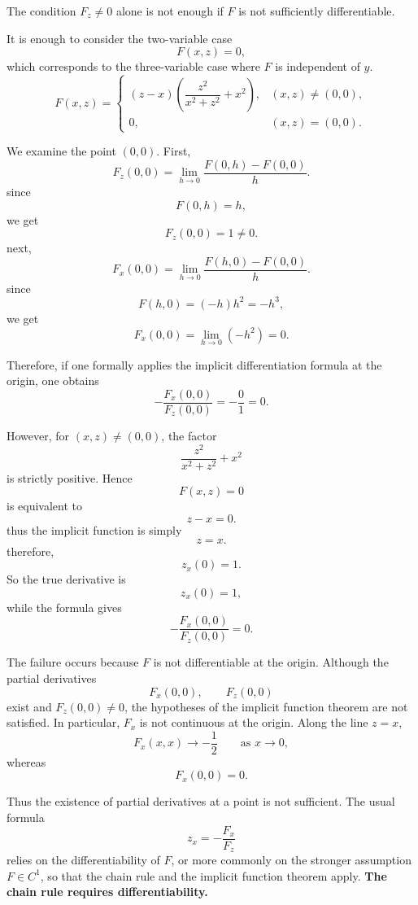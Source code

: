 \documentclass[a4]{overview}
\begin{document}
The condition \(F_z\neq 0\) alone is not enough if \(F\) is not sufficiently differentiable.

\begin{example}[A Counterexample]	

It is enough to consider the two-variable case
\[
F(x,z)=0,
\]
which corresponds to the three-variable case where \(F\) is independent of \(y\).
\[
F(x,z)=
\begin{cases}
(z-x)\left(\dfrac{z^2}{x^2+z^2}+x^2\right),
& (x,z)\neq (0,0),\\[1em]
0,
& (x,z)=(0,0).
\end{cases}
\]

We examine the point \((0,0)\). First,
\[
F_z(0,0)
=
\lim_{h\to 0}\frac{F(0,h)-F(0,0)}{h}.
\]
since
\[
F(0,h)=h,
\]
we get
\[
F_z(0,0)=1\neq 0.
\]
next,
\[
F_x(0,0)
=
\lim_{h\to 0}\frac{F(h,0)-F(0,0)}{h}.
\]
since
\[
F(h,0)=(-h)h^2=-h^3,
\]
we get
\[
F_x(0,0)
=
\lim_{h\to 0}(-h^2)=0.
\]

Therefore, if one formally applies the implicit differentiation formula at the origin, one obtains
\[
-\frac{F_x(0,0)}{F_z(0,0)}
=
-\frac{0}{1}
=
0.
\]

However, for \((x,z)\neq (0,0)\), the factor
\[
\dfrac{z^2}{x^2+z^2}+x^2
\]
is strictly positive. Hence
\[
F(x,z)=0
\]
is equivalent to
\[
z-x=0.
\]
thus the implicit function is simply
\[
z=x.
\]
therefore,
\[
z_x(0)=1.
\]
So the true derivative is
\[
z_x(0)=1,
\]
while the formula gives
\[
-\frac{F_x(0,0)}{F_z(0,0)}=0.
\]

\end{example}

\begin{remark} The failure occurs because \(F\) is not differentiable
	at the origin. Although the partial derivatives
\[
F_x(0,0),\qquad F_z(0,0)
\]
exist and \(F_z(0,0)\neq 0\), the hypotheses of the implicit function theorem are not satisfied.
In particular, \(F_x\) is not continuous at the origin. Along the line \(z=x\),
\[
F_x(x,x)\to -\frac12
\qquad \text{as } x\to 0,
\]
whereas
\[
F_x(0,0)=0.
\]

Thus the existence of partial derivatives at a point is not sufficient. The usual formula
\[
z_x=-\frac{F_x}{F_z}
\]
relies on the differentiability of \(F\), or more commonly on the stronger assumption \(F\in C^1\),
so that the chain rule and the implicit function theorem apply.
\textbf{The chain rule requires differentiability.}

\end{remark}
\end{document}
